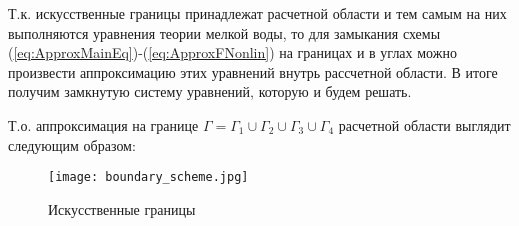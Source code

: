 Т.к. искусственные границы принадлежат расчетной области и тем самым на них выполняются уравнения теории мелкой воды, то для замыкания схемы (\ref{eq:ApproxMainEq})-(\ref{eq:ApproxFNonlin}) на границах и в углах можно произвести аппроксимацию этих уравнений внутрь рассчетной области. В итоге получим замкнутую систему уравнений, которую и будем решать.

Т.о. аппроксимация на границе $\Gamma=\Gamma_1\cup \Gamma_2\cup \Gamma_3\cup \Gamma_4$ расчетной области выглядит следующим образом:

\begin{figure}[htp]
    \centering
    \texttt{[image: boundary\_scheme.jpg]}
    \caption{Искусственные границы}
    \label{figure:boundary_schema}
\end{figure}

